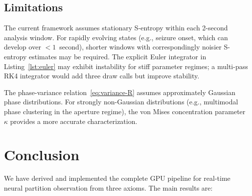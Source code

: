 \documentclass[11pt,twocolumn,a4paper]{article}
\begin{document}
\subsection{Limitations}

The current framework assumes stationary S-entropy within each 2-second analysis window.
For rapidly evolving states (e.g., seizure onset, which can develop over $<1$~second), shorter windows with correspondingly noisier S-entropy estimates may be required.
The explicit Euler integrator in Listing~\ref{lst:euler} may exhibit instability for stiff parameter regimes; a multi-pass RK4 integrator would add three draw calls but improve stability.

The phase-variance relation~\eqref{eq:variance-R} assumes approximately Gaussian phase distributions.
For strongly non-Gaussian distributions (e.g., multimodal phase clustering in the aperture regime), the von Mises concentration parameter $\kappa$ provides a more accurate characterization.



\section{Conclusion}
\label{sec:conclusion}

We have derived and implemented the complete GPU pipeline for real-time neural partition observation from three axioms.
The main results are:
\end{document}
